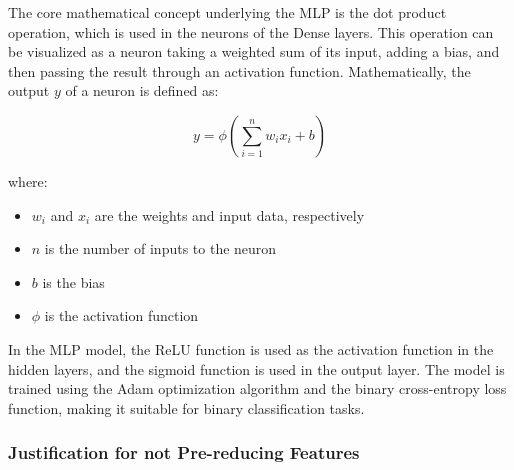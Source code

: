 \documentclass[
	article, %
	11pt, %
	draft, %
]{CSUniSchoolLabReport}
\begin{document}
The core mathematical concept underlying the MLP is the dot product operation, which is used in the neurons of the Dense layers. This operation can be visualized as a neuron taking a weighted sum of its input, adding a bias, and then passing the result through an activation function. Mathematically, the output \(y\) of a neuron is defined as:

\[
y = \phi \left( \sum_{i=1}^{n} w_i x_i + b \right)
\]

where:
\begin{itemize}
  \item \(w_i\) and \(x_i\) are the weights and input data, respectively
  \item \(n\) is the number of inputs to the neuron
  \item \(b\) is the bias
  \item \(\phi\) is the activation function
\end{itemize}

In the MLP model, the ReLU function is used as the activation function in the hidden layers, and the sigmoid function is used in the output layer. The model is trained using the Adam optimization algorithm and the binary cross-entropy loss function, making it suitable for binary classification tasks.

\subsubsection{Justification for not Pre-reducing Features}%


\end{document}
